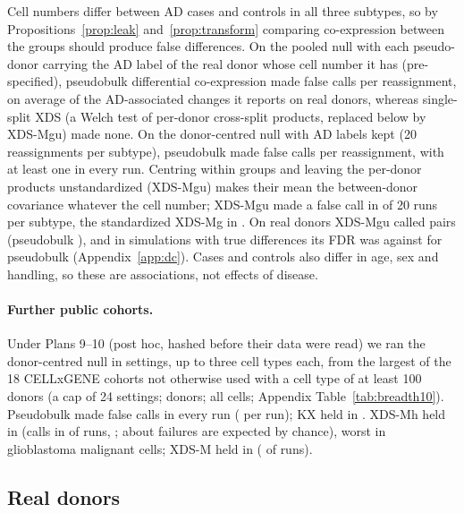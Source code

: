 Cell numbers differ between AD cases and controls in all three subtypes, so by Propositions~\ref{prop:leak} and~\ref{prop:transform} comparing co-expression between the groups should produce false differences. On the pooled null with each pseudo-donor carrying the AD label of the real donor whose cell number it has (pre-specified), pseudobulk differential co-expression made \DCnullCalls{} false calls per reassignment, on average \DCshare{} of the AD-associated changes it reports on real donors, whereas single-split XDS (a Welch test of per-donor cross-split products, replaced below by XDS-Mgu) made none. On the donor-centred null with AD labels kept (20 reassignments per subtype), pseudobulk made \RfDCPB{} false calls per reassignment, with at least one in every run. Centring within groups and leaving the per-donor products unstandardized (XDS-Mgu) makes their mean the between-donor covariance whatever the cell number; XDS-Mgu made a false call in \RfDCgu{} of 20 runs per subtype, the standardized XDS-Mg in \RfDCg{}. On real donors XDS-Mgu called \DCrealU{} pairs (pseudobulk \DCrealPB), and in simulations with true differences its FDR was \DCtwoFDRU{} against \DCtwoFDRPB{} for pseudobulk (Appendix~\ref{app:dc}). Cases and controls also differ in age, sex and handling, so these are associations, not effects of disease.

\LupusText

\paragraph{Further public cohorts.} Under Plans 9--10 (post hoc, hashed before their data were read) we ran the donor-centred null in \BtN{} settings, up to three cell types each, from the \BtColl{} largest of the 18 CELLxGENE cohorts not otherwise used with a cell type of at least 100 donors (a cap of 24 settings; \BtDonors{} donors; all cells; Appendix Table~\ref{tab:breadth10}). Pseudobulk made false calls in every run (\BtPBcalls{} per run); KX held in \BtKXheld. XDS-Mh held in \BtHheld{} (calls in \BtHk{} of \BtHn{} runs, \BtHpct; about \BtExpFail{} failures are expected by chance), worst in glioblastoma malignant cells; XDS-M held in \BtXheld{} (\BtXpct{} of runs).

\subsection{Real donors}\label{sec:real}

